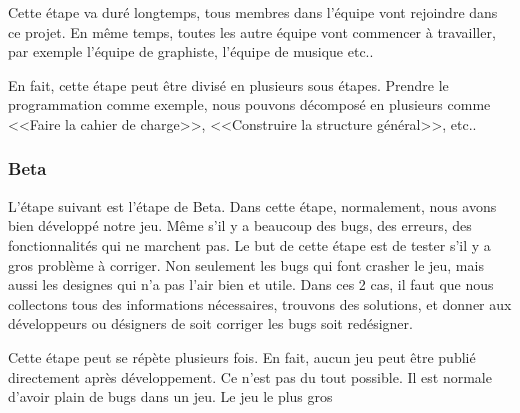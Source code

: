 Cette étape va duré longtemps, tous membres dans l'équipe vont rejoindre dans ce projet. En même temps, toutes les autre équipe vont commencer à travailler, par exemple l'équipe de graphiste, l'équipe de musique etc.. 

En fait, cette étape peut être divisé en plusieurs sous étapes. Prendre le programmation comme exemple, nous pouvons décomposé en plusieurs comme <<Faire la cahier de charge>>, <<Construire la structure général>>, etc..


\subsubsection{Beta} %

L'étape suivant est l'étape de Beta. Dans cette étape, normalement, nous avons bien développé notre jeu. Même s'il y a beaucoup des bugs, des erreurs, des fonctionnalités qui ne marchent pas. Le but de cette étape est de tester s'il y a gros problème à corriger. Non seulement les bugs qui font crasher le jeu, mais aussi les designes qui n'a pas l'air bien et utile. Dans ces 2 cas, il faut que nous collectons tous des informations nécessaires, trouvons des solutions, et donner aux développeurs ou désigners de soit corriger les bugs soit redésigner. 

Cette étape peut se répète plusieurs fois. En fait, aucun jeu peut être publié directement après développement. Ce n'est pas du tout possible. Il est normale d'avoir plain de bugs dans un jeu. Le jeu le plus gros 








